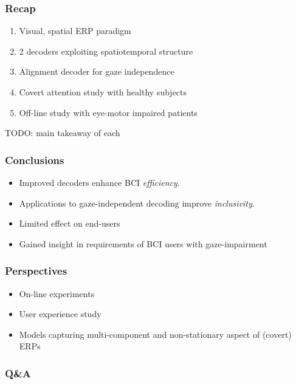 \documentclass{kul-ulille-beamer}
\begin{document}
\begin{frame}
  \frametitle{Recap}
  \begin{changemargin}
    \begin{enumerate}
      \item Visual, spatial ERP paradigm
      \item 2 decoders exploiting spatiotemporal structure
      \item Alignment decoder for gaze independence
      \item Covert attention study with healthy subjects
      \item Off-line study with eye-motor impaired patients
    \end{enumerate}
    TODO: main takeaway of each
  \end{changemargin}
\end{frame}

\begin{frame}
    \frametitle{Conclusions}
    \begin{changemargin}
    \begin{itemize}
      \item Improved decoders enhance BCI \emph{efficiency}.
      \item Applications to gaze-independent decoding improve \emph{inclusivity}.
      \item Limited effect on end-users
      \item Gained insight in requirements of BCI users with gaze-impairment
    \end{itemize}
  \end{changemargin}
\end{frame}

\begin{frame}
  \frametitle{Perspectives}
  \begin{changemargin}
    \begin{itemize}

     \item On-line experiments
     \item User experience study
     \item Models capturing multi-component and
       non-stationary aspect of (covert) ERPs
  \end{itemize}
  \end{changemargin}
\end{frame}

\begin{frame}
  \frametitle{Q\&A}
  \centering
	\inserttitlegraphic
\end{frame}
%
\end{document}
